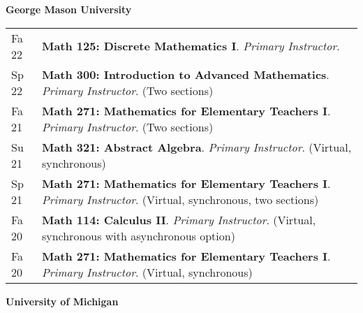 
    \medskip


    \medskip
    \medskip



    \textbf{\large George Mason University}
    
    \begin{center}
    {
    \renewcommand{\arraystretch}{1.2}
    \begin{longtable}{p{}  p{}}
      Fa 22 & \textbf{{\normalfont Math 125:} Discrete Mathematics I}. \textit{Primary Instructor}.  \\ 
  Sp 22 & \textbf{{\normalfont Math 300:} Introduction to Advanced Mathematics}. \textit{Primary Instructor}. (Two sections) \\ 
  Fa 21 & \textbf{{\normalfont Math 271:} Mathematics for Elementary Teachers I}. \textit{Primary Instructor}. (Two sections) \\ 
  Su 21 & \textbf{{\normalfont Math 321:} Abstract Algebra}. \textit{Primary Instructor}. (Virtual, synchronous) \\ 
  Sp 21 & \textbf{{\normalfont Math 271:} Mathematics for Elementary Teachers I}. \textit{Primary Instructor}. (Virtual, synchronous, two sections) \\ 
  Fa 20 & \textbf{{\normalfont Math 114:} Calculus II}. \textit{Primary Instructor}. (Virtual, synchronous with asynchronous option) \\ 
  Fa 20 & \textbf{{\normalfont Math 271:} Mathematics for Elementary Teachers I}. \textit{Primary Instructor}. (Virtual, synchronous) 
    \end{longtable}
    } 
    \end{center}

    \vspace{-1em}
    

    \textbf{\large University of Michigan}
    
